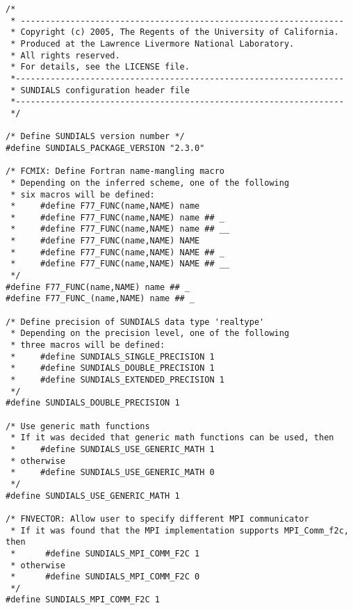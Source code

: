 \begin{lstlisting}
/*
 * -----------------------------------------------------------------
 * Copyright (c) 2005, The Regents of the University of California.
 * Produced at the Lawrence Livermore National Laboratory.
 * All rights reserved.
 * For details, see the LICENSE file.
 *------------------------------------------------------------------
 * SUNDIALS configuration header file
 *------------------------------------------------------------------
 */

/* Define SUNDIALS version number */
#define SUNDIALS_PACKAGE_VERSION "2.3.0"

/* FCMIX: Define Fortran name-mangling macro 
 * Depending on the inferred scheme, one of the following 
 * six macros will be defined:
 *     #define F77_FUNC(name,NAME) name
 *     #define F77_FUNC(name,NAME) name ## _
 *     #define F77_FUNC(name,NAME) name ## __
 *     #define F77_FUNC(name,NAME) NAME
 *     #define F77_FUNC(name,NAME) NAME ## _
 *     #define F77_FUNC(name,NAME) NAME ## __
 */
#define F77_FUNC(name,NAME) name ## _
#define F77_FUNC_(name,NAME) name ## _

/* Define precision of SUNDIALS data type 'realtype' 
 * Depending on the precision level, one of the following 
 * three macros will be defined:
 *     #define SUNDIALS_SINGLE_PRECISION 1
 *     #define SUNDIALS_DOUBLE_PRECISION 1
 *     #define SUNDIALS_EXTENDED_PRECISION 1
 */
#define SUNDIALS_DOUBLE_PRECISION 1

/* Use generic math functions 
 * If it was decided that generic math functions can be used, then
 *     #define SUNDIALS_USE_GENERIC_MATH 1
 * otherwise
 *     #define SUNDIALS_USE_GENERIC_MATH 0
 */
#define SUNDIALS_USE_GENERIC_MATH 1

/* FNVECTOR: Allow user to specify different MPI communicator
 * If it was found that the MPI implementation supports MPI_Comm_f2c, then
 *      #define SUNDIALS_MPI_COMM_F2C 1
 * otherwise
 *      #define SUNDIALS_MPI_COMM_F2C 0
 */
#define SUNDIALS_MPI_COMM_F2C 1
\end{lstlisting}



